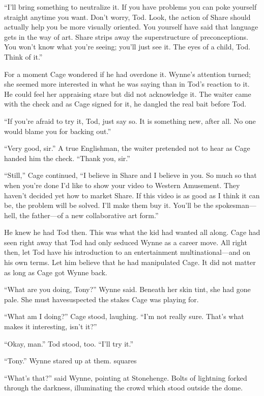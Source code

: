 “I’ll bring something to neutralize it. If you have problems you can poke yourself straight anytime you want. Don’t worry, Tod. Look, the action of Share should actually help you be more visually oriented. You yourself have said that language gets in the way of art. Share strips away the superstructure of preconceptions. You won’t know what you’re seeing; you’ll just see it. The eyes of a child, Tod. Think of it.”

For a moment Cage wondered if he had overdone it. Wynne’s attention turned; she seemed more interested in what he was saying than in Tod’s reaction to it. He could feel her appraising stare but did not acknowledge it. The waiter came with the check and as Cage signed for it, he dangled the real bait before Tod.

“If you’re afraid to try it, Tod, just say so. It is something new, after all. No one would blame you for backing out.”

“Very good, sir.” A true Englishman, the waiter pretended not to hear as Cage handed him the check. “Thank you, sir.”

“Still,” Cage continued, “I believe in Share and I believe in you. So much so that when you’re done I’d like to show your video to Western Amusement. They haven’t decided yet how to market Share. If this video is as good as I think it can be, the problem will be solved. I’ll make them buy it. You’ll be the spokesman—hell, the father—of a new collaborative art form.”

He knew he had Tod then. This was what the kid had wanted all along. Cage had seen right away that Tod had only seduced Wynne as a career move. All right then, let Tod have his introduction to an entertainment multinational—and on his own terms. Let him believe that he had manipulated Cage. It did not matter as long as Cage got Wynne back.

“What are you doing, Tony?” Wynne said. Beneath her skin tint, she had gone pale. She must havesuspected the stakes Cage was playing for.

“What am I doing?” Cage stood, laughing. “I’m not really sure. That’s what makes it interesting, isn’t it?”

“Okay, man.” Tod stood, too. “I’ll try it.”

“Tony.” Wynne stared up at them.
squares

“What’s that?” said Wynne, pointing at Stonehenge. Bolts of lightning forked through the darkness, illuminating the crowd which stood outside the dome.

